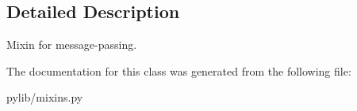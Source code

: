 \subsection{Detailed Description}
\begin{DoxyVerb}Mixin for message-passing.\end{DoxyVerb}
 

The documentation for this class was generated from the following file\-:\begin{DoxyCompactItemize}
\item 
pylib/mixins.\-py\end{DoxyCompactItemize}
